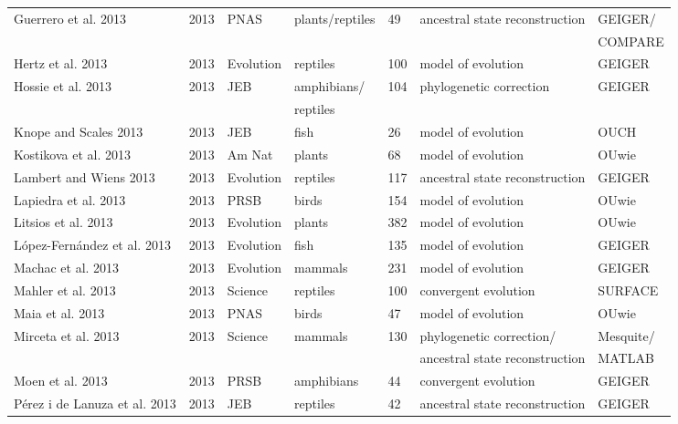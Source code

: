 \begin{landscape}
\begin{center}
\begin{longtable}{p{6cm}llllll}
Guerrero et al. 2013  &   2013    &   PNAS    &   plants/reptiles &   49  &   ancestral state reconstruction  &   GEIGER/ \\
    &       &       &       &       &       &   COMPARE \\
Hertz et al. 2013 &   2013    &   Evolution   &   reptiles    &   100 &   model of evolution  &   GEIGER  \\
Hossie et al. 2013    &   2013    &   JEB &   amphibians/ &   104 &   phylogenetic correction &   GEIGER  \\
    &       &       &   reptiles    &       &       &       \\
Knope and Scales 2013 &   2013    &   JEB &   fish    &   26  &   model of evolution  &   OUCH    \\
Kostikova et al. 2013 &   2013    &   Am Nat  &   plants  &   68  &   model of evolution  &   OUwie   \\
Lambert and Wiens 2013    &   2013    &   Evolution   &   reptiles    &   117 &   ancestral state reconstruction  &   GEIGER  \\
Lapiedra et al. 2013  &   2013    &   PRSB    &   birds   &   154 &   model of evolution  &   OUwie   \\
Litsios et al. 2013   &   2013    &   Evolution   &   plants  &   382 &   model of evolution  &   OUwie   \\
L\'{o}pez-Fern\'{a}ndez et al. 2013   &   2013    &   Evolution   &   fish    &   135 &   model of evolution  &   GEIGER  \\
Machac et al. 2013    &   2013    &   Evolution   &   mammals &   231 &   model of evolution  &   GEIGER  \\
Mahler et al. 2013    &   2013    &   Science &   reptiles    &   100 &   convergent evolution    &   SURFACE \\
Maia et al. 2013  &   2013    &   PNAS    &   birds   &   47  &   model of evolution  &   OUwie   \\
Mirceta et al. 2013   &   2013    &   Science &   mammals &   130 &   phylogenetic correction/    &   Mesquite/   \\
    &       &       &       &       &   ancestral state reconstruction  &   MATLAB  \\
Moen et al. 2013  &   2013    &   PRSB    &   amphibians  &   44  &   convergent evolution    &   GEIGER  \\
P\'{e}rez i de Lanuza et al. 2013 &   2013    &   JEB &   reptiles    &   42  &   ancestral state reconstruction  &   GEIGER  \\

\end{longtable}
\end{center}
\end{landscape}
